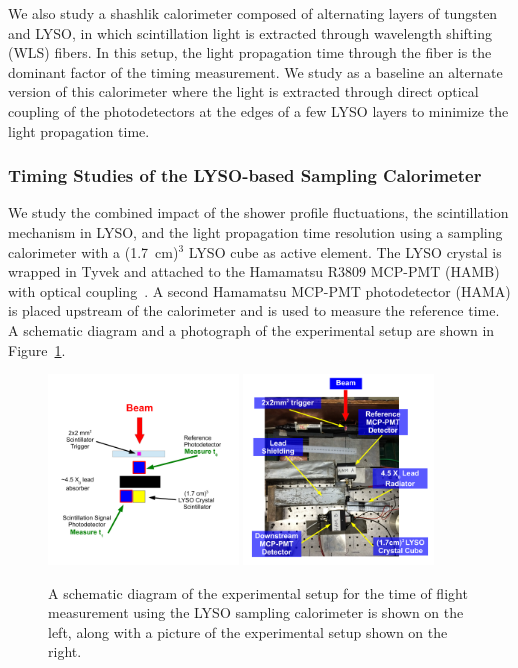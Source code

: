We also study a shashlik calorimeter composed of alternating layers of
tungsten and LYSO, in which scintillation light is extracted through wavelength
shifting (WLS) fibers. In this setup, the light propagation time through the fiber is the
dominant factor of the timing measurement. We study as a baseline an alternate version of this
calorimeter where the light is extracted through direct optical coupling of  the 
photodetectors at the edges of a few LYSO layers to minimize  the light propagation time.


\subsubsection{Timing Studies of the LYSO-based Sampling Calorimeter}

We study the combined impact of the shower profile fluctuations, the
scintillation mechanism in LYSO, and the light propagation time resolution
using a sampling calorimeter with a (1.7~cm)$^{3}$ LYSO cube as active
element. The LYSO crystal is wrapped in Tyvek and attached to the Hamamatsu
R3809 MCP-PMT (HAMB) with optical coupling~\cite{grease}.   A second Hamamatsu 
MCP-PMT  photodetector (HAMA)  is placed upstream of the calorimeter and is used 
to measure the reference time. A schematic diagram and a photograph of the experimental setup
are shown in Figure~\ref{fig:LYSOSamplingCaloSetup}. 

\begin{figure}[h] \centering
\includegraphics[width=0.45\textwidth]{figs/LYSOSamplingCaloSetupSchematic} 
\includegraphics[width=0.45\textwidth]{figs/LYSOSamplingCaloSetupPhoto} 
\caption{ \small A schematic diagram of the experimental setup for the
time of flight measurement using the LYSO sampling calorimeter is shown
on the left, along with a picture of the experimental setup shown on the right. } 
\label{fig:LYSOSamplingCaloSetup}
\end{figure}

